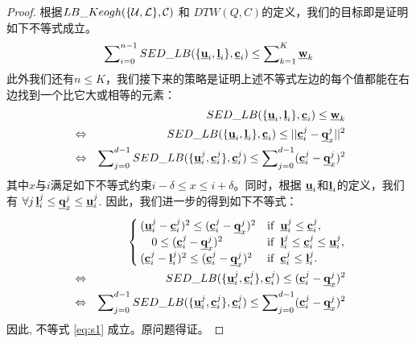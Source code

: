 \begin{proof}
	根据$LB\_Keogh({\{\cal U,\cal L\},{\cal C}})$ 和 $DTW(Q,C)$的定义，我们的目标即是证明如下不等式成立。
	\begin{equation}
	\sum\nolimits_{i=0}^{n-1}SED\_LB(\{{\emph{{\textbf{u}}}_{i}},\emph{{\textbf{l}}}_{i} \},\emph{{\textbf{c}}}_{i}) \le \sum\nolimits_{k=1}^{K}\emph{{\textbf{w}}}_{k}
	\end{equation}	
	此外我们还有$n \le K$，我们接下来的策略是证明上述不等式左边的每个值都能在右边找到一个比它大或相等的元素：
	\begin{eqnarray}\label{eq:s1}
	&&	SED\_LB(\{{\emph{{\textbf{u}}}_{i}},\emph{{\textbf{l}}}_{i} \},\emph{{\textbf{c}}}_{i}) \le \emph{{\textbf{w}}}_{k} \nonumber\\
	&\Leftrightarrow& SED\_LB(\{{\emph{{\textbf{u}}}_{i}},\emph{{\textbf{l}}}_{i} \},\emph{{\textbf{c}}}_{i}) \le    || {\emph{{\textbf{c}}}}_{i}^{j} - {\emph{{\textbf{q}}}}_{x}^{j}||^2 \nonumber\\
	&\Leftrightarrow& \sum\nolimits_{j=0}^{d-1}SED\_LB(\{ \emph{{\textbf{u}}}_{i}^{j}, {\emph{{\textbf{c}}}}_{i}^{j}\},{\emph{{\textbf{c}}}}_{i}^{j}) \le \sum\nolimits_{j=0}^{d-1}({\emph{{\textbf{c}}}}_{i}^{j} - {\emph{{\textbf{q}}}}_{x}^{j})^2 
	\end{eqnarray}
	其中$x$与$i$满足如下不等式约束$i-\delta \le x \le i+\delta$。同时，根据 $\emph{{\textbf{u}}}_{i}$和$\emph{{\textbf{l}}}_{i}$的定义，我们有
	$\forall j  \, {\emph{{\textbf{l}}}}_{i}^{j}  \le \emph{{\textbf{q}}}_{x}^{j} \le {\emph{{\textbf{u}}}}_{i}^{j}$.
	因此，我们进一步的得到如下不等式：
	\begin{eqnarray}
	&&\begin{cases}
	({\emph{{\textbf{u}}}}_{i}^{j}- {\emph{{\textbf{c}}}}_{i}^{j})^2 \le ({\emph{{\textbf{c}}}}_{i}^{j} - {\emph{{\textbf{q}}}}_{x}^{j})^2 & {\rm if}  \,\,\,    \emph{{\textbf{u}}}_{i}^{j} \le {\emph{{\textbf{c}}}}_{i}^{j},\\
	\quad 0 \le ({\emph{{\textbf{c}}}}_{i}^{j} - {\emph{{\textbf{q}}}}_{x}^{j})^2 & {\rm if}  \,\,\,   {\emph{{\textbf{l}}}}_{i}^{j} \le  {\emph{{\textbf{c}}}}_{i}^{j} \le {\emph{{\textbf{u}}}}_{i}^{j},\\
	({\emph{{\textbf{c}}}}_{i}^{j} -{\emph{{\textbf{l}}}}_{i}^{j})^2 \le ({\emph{{\textbf{c}}}}_{i}^{j} - {\emph{{\textbf{q}}}}_{x}^{j})^2 & {\rm if}  \,\,\,     {\emph{{\textbf{c}}}}_{i}^{j} \le {\emph{{\textbf{l}}}}_{i}^{j}.
	\end{cases} \nonumber \\
	&\Leftrightarrow&SED\_LB(\{ \emph{{\textbf{u}}}_{i}^{j}, {\emph{{\textbf{c}}}}_{i}^{j}\},{\emph{{\textbf{c}}}}_{i}^{j}) \le ({\emph{{\textbf{c}}}}_{i}^{j} - {\emph{{\textbf{q}}}}_{x}^{j})^2 \nonumber \\
	&\Leftrightarrow& \sum\nolimits_{j=0}^{d-1}SED\_LB(\{ \emph{{\textbf{u}}}_{i}^{j}, {\emph{{\textbf{c}}}}_{i}^{j}\},{\emph{{\textbf{c}}}}_{i}^{j}) \le \sum\nolimits_{j=0}^{d-1}({\emph{{\textbf{c}}}}_{i}^{j} - {\emph{{\textbf{q}}}}_{x}^{j})^2  
	\end{eqnarray}
	因此, 不等式 \ref{eq:s1} 成立。原问题得证。
\end{proof}



